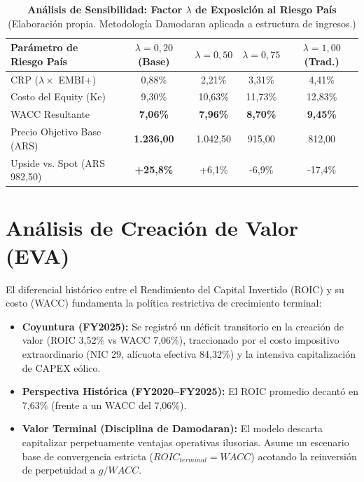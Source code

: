 \documentclass[10pt,a4paper]{article}
\begin{document}
\begin{table}[H]
\centering
\caption{\textbf{Análisis de Sensibilidad: Factor $\lambda$ de Exposición al Riesgo País} {\small\color{gsgray} (Elaboración propia. Metodología Damodaran aplicada a estructura de ingresos.)}}
\small
\begin{tabular}{lcccc}
\toprule
\textbf{Parámetro de Riesgo País} & \textbf{$\lambda = 0,20$ (Base)} & \textbf{$\lambda = 0,50$} & \textbf{$\lambda = 0,75$} & \textbf{$\lambda = 1,00$ (Trad.)} \\
\midrule
CRP ($\lambda \times$ EMBI+) & 0,88\% & 2,21\% & 3,31\% & 4,41\% \\
Costo del Equity (Ke) & 9,30\% & 10,63\% & 11,73\% & 12,83\% \\
WACC Resultante & \textbf{7,06\%} & \textbf{7,96\%} & \textbf{8,70\%} & \textbf{9,45\%} \\
Precio Objetivo Base (ARS) & \textbf{1.236,00} & 1.042,50 & 915,00 & 812,00 \\
Upside vs. Spot (ARS 982,50) & \textbf{+25,8\%} & +6,1\% & -6,9\% & -17,4\% \\
\bottomrule
\end{tabular}
\end{table}

\section{Análisis de Creación de Valor (EVA)}
El diferencial histórico entre el Rendimiento del Capital Invertido (ROIC) y su costo (WACC) fundamenta la política restrictiva de crecimiento terminal:
\begin{itemize}
    \item \textbf{Coyuntura (FY2025):} Se registró un déficit transitorio en la creación de valor (ROIC 3,52\% vs WACC 7,06\%), traccionado por el costo impositivo extraordinario (NIC 29, alícuota efectiva 84,32\%) y la intensiva capitalización de CAPEX eólico.
    \item \textbf{Perspectiva Histórica (FY2020–FY2025):} El ROIC promedio decantó en 7,63\% (frente a un WACC del 7,06\%).
    \item \textbf{Valor Terminal (Disciplina de Damodaran):} El modelo descarta capitalizar perpetuamente ventajas operativas ilusorias. Asume un escenario base de convergencia estricta ($ROIC_{terminal}=WACC$) acotando la reinversión de perpetuidad a $g/WACC$.
\end{itemize}
\end{document}
